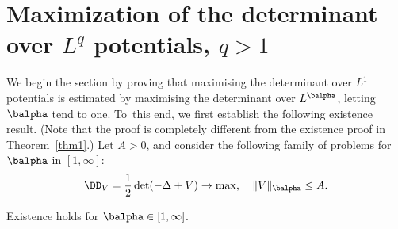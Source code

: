 \section{Maximization of the determinant over \texorpdfstring{$L^q$}{Lq} potentials, \texorpdfstring{$q>1$}{q>1}}\label{s4}
We begin the section by proving that maximising the determinant over $L^1$ poten\-tials
is estimated by maximising the determinant over $L^\balpha$, letting $\balpha$ tend to
one. To~this end, we first establish the following existence result. (Note that the
proof is completely different from the existence proof in Theorem~\ref{thm1}.)
Let $A>0$, and consider the following family of problems for $\balpha$ in $[1,\infty]$:
\begin{equation} \label{eq30}
\DD_V = \frac{1}{2}\det(-\Delta+V) \to \max,\quad \|V\|_\balpha \leq A.
\end{equation}

\begin{prop} \label{prop8}
Existence holds for $\balpha \in [1,\infty]$.
\end{prop}

